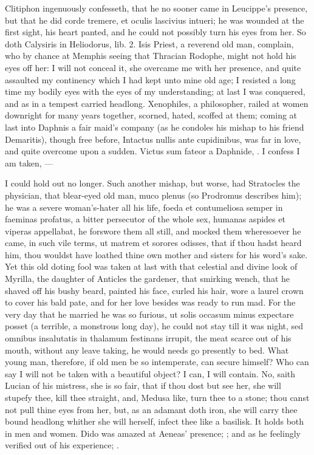 {Clitiphon ingenuously confesseth, that he no sooner came in
Leucippe's presence, but that he did corde tremere, et oculis lascivius
intueri; he was wounded at the first sight, his heart panted, and
he could not possibly turn his eyes from her. So doth Calysiris in
Heliodorus, lib. 2. Isis Priest, a reverend old man, complain, who by
chance at Memphis seeing that Thracian Rodophe, might not hold his eyes
off her: I will not conceal it, she overcame me with her
presence, and quite assaulted my continency which I had kept unto mine
old age; I resisted a long time my bodily eyes with the eyes of my
understanding; at last I was conquered, and as in a tempest carried
headlong.  Xenophiles, a philosopher, railed at women downright
for many years together, scorned, hated, scoffed at them; coming at
last into Daphnis a fair maid's company (as he condoles his mishap to
his friend Demaritis), though free before, Intactus nullis ante
cupidinibus, was far in love, and quite overcome upon a sudden. Victus
sum fateor a Daphnide, \etc{}. I confess I am taken,
---

I could hold out no longer. Such another mishap, but worse, had
Stratocles the physician, that blear-eyed old man, muco plenus (so
Prodromus describes him); he was a severe woman's-hater all his
life, foeda et contumeliosa semper in faeminas profatus, a bitter
persecutor of the whole sex, humanas aspides et viperas appellabat, he
forswore them all still, and mocked them wheresoever he came, in such
vile terms, ut matrem et sorores odisses, that if thou hadst heard him,
thou wouldst have loathed thine own mother and sisters for his word's
sake. Yet this old doting fool was taken at last with that celestial
and divine look of Myrilla, the daughter of Anticles the gardener, that
smirking wench, that he shaved off his bushy beard, painted his face,
curled his hair, wore a laurel crown to cover his bald pate, and
for her love besides was ready to run mad. For the very day that he
married he was so furious, ut solis occasum minus expectare posset (a
terrible, a monstrous long day), he could not stay till it was night,
sed omnibus insalutatis in thalamum festinans irrupit, the meat scarce
out of his mouth, without any leave taking, he would needs go presently
to bed. What young man, therefore, if old men be so intemperate, can
secure himself? Who can say I will not be taken with a beautiful
object? I can, I will contain. No, saith Lucian of his mistress,
she is so fair, that if thou dost but see her, she will stupefy thee,
kill thee straight, and, Medusa like, turn thee to a stone; thou canst
not pull thine eyes from her, but, as an adamant doth iron, she will
carry thee bound headlong whither she will herself, infect thee like a
basilisk. It holds both in men and women. Dido was amazed at Aeneas'
presence; ; and as he feelingly
verified out of his experience;
.

}
